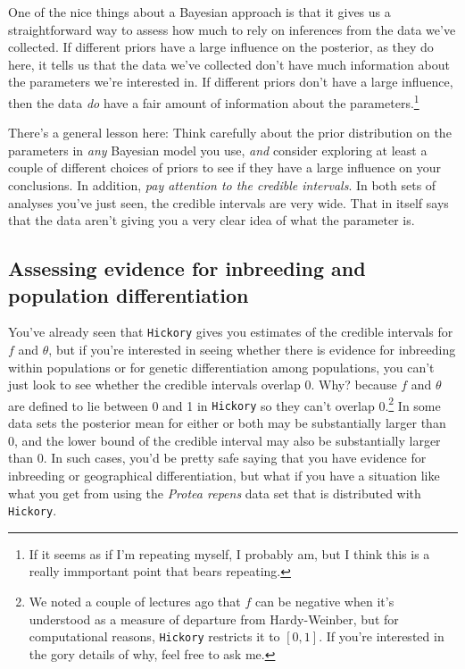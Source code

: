 \documentclass[12pt]{article}
\begin{document}
One of the nice things about a Bayesian approach is that it gives us a
straightforward way to assess how much to rely on inferences from the
data we've collected. If different priors have a large influence on
the posterior, as they do here, it tells us that the data we've
collected don't have much information about the parameters we're
interested in. If different priors don't have a large influence, then
the data {\it do\/} have a fair amount of information about the
parameters.\footnote{If it seems as if I'm repeating myself, I
  probably am, but I think this is a really immportant point that
  bears repeating.} 

There's a general lesson here: Think carefully about the prior
distribution on the parameters in {\it any\/} Bayesian model you use,
{\it and\/} consider exploring at least a couple of different choices
of priors to see if they have a large influence on your
conclusions. In addition, {\it pay attention to the credible
  intervals}. In both sets of analyses you've just seen, the credible
intervals are very wide. That in itself says that the data aren't
giving you a very clear idea of what the parameter is.

\subsection*{Assessing evidence for inbreeding and population
  differentiation}

You've already seen that {\tt Hickory} gives you estimates of the
credible intervals for $f$ and $\theta$, but if you're interested in
seeing whether there is evidence for inbreeding within populations or
for genetic differentiation among populations, you can't just look to
see whether the credible intervals overlap $0$. Why? because $f$ and
$\theta$ are defined to lie between 0 and 1 in {\tt Hickory} so they
can't overlap 0.\footnote{We noted a couple of lectures ago that $f$
  can be negative when it's understood as a measure of departure from
  Hardy-Weinber, but for computational reasons, {\tt Hickory}
  restricts it to $[0,1]$. If you're interested in the gory details of
  why, feel free to ask me.} In some data sets the posterior mean for
either or both may be substantially larger than 0, and the lower bound
of the credible interval may also be substantially larger than 0. In
such cases, you'd be pretty safe saying that you have evidence for
inbreeding or geographical differentiation, but what if you have a
situation like what you get from using the {\it Protea repens\/} data
set that is distributed with {\tt Hickory}.
\end{document}

